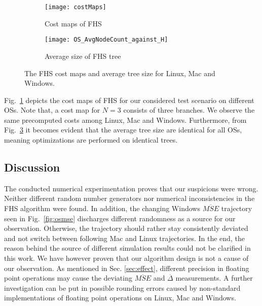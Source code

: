 \begin{figure}[htbp]
  \centering
  \begin{subfigure}[b]{0.49\textwidth}
      \centering
      \texttt{[image: costMaps]}
      \caption{Cost maps of FHS}
      \label{fig:costMaps}
  \end{subfigure}
  \hfill
  \begin{subfigure}[b]{0.49\textwidth}
      \centering
      \texttt{[image: OS\_AvgNodeCount\_against\_H]}
      \caption{Average size of FHS tree}
      \label{fig:treesize}
  \end{subfigure}
    \caption[Comparison of FHS cost maps and average tree size for different
    OS]{The FHS cost maps and average tree size for Linux, Mac and Windows.}
\end{figure}

Fig.~\ref{fig:costMaps} depicts the cost maps of FHS for our considered test
scenario on different OSs. Note that, a cost map for $N=3$ consists of three
branches. We observe the same precomputed costs among Linux, Mac and Windows.
Furthermore, from Fig.~\ref{fig:treesize} it becomes evident that the average
tree size are identical for all OSs, meaning optimizations are performed on
identical trees. 

\subsection{Discussion}

The conducted numerical experimentation proves that our suspicions were wrong.
Neither different random number generators nor numerical inconsistencies in the
FHS algorithm were found. In addition, the changing Windows $\overline{MSE}$
trajectory seen in Fig.~\ref{fig:osmse} discharges different randomness as a
source for our observation. Otherwise, the trajectory should rather stay
consistently deviated and not switch between following Mac and Linux
trajectories. In the end, the reason behind the source of different simulation
results could not be clarified in this work. We have however proven that our
algorithm design is not a cause of our observation. As mentioned in Sec.
\ref{sec:effect}, different precision in floating point operations may cause the
deviating $\overline{MSE}$ and $\overline{\Delta}$ measurements. A further
investigation can be put in possible rounding errors caused by non-standard
implementations of floating point operations on Linux, Mac and Windows.
